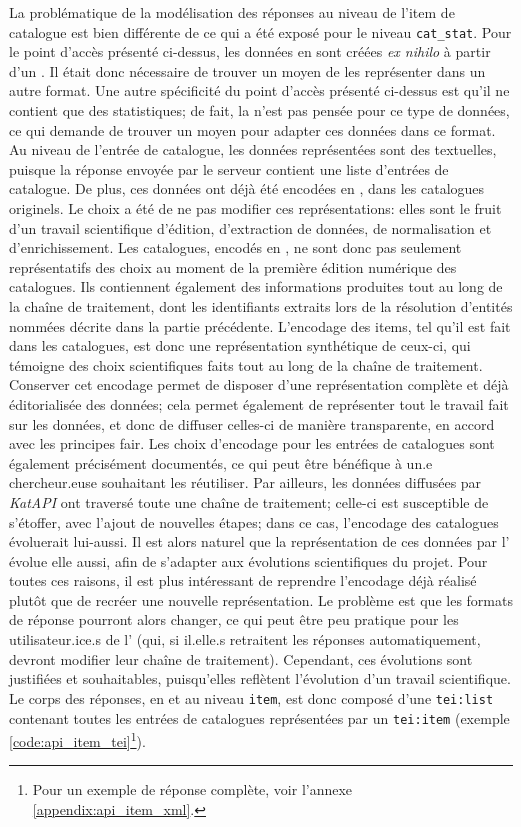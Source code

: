 La problématique de la modélisation des réponses au niveau de l'item de catalogue est bien différente de ce qui a été exposé pour le niveau \texttt{cat\_stat}. Pour le point d'accès présenté ci-dessus, les données en \tei{} sont créées \textit{ex nihilo} à partir d'un \json{}. Il était donc nécessaire de trouver un moyen de les représenter dans un autre format. Une autre spécificité du point d'accès présenté ci-dessus est qu'il ne contient que des statistiques; de fait, la \tei{} n'est pas pensée pour ce type de données, ce qui demande de trouver un moyen pour adapter ces données dans ce format. Au niveau de l'entrée de catalogue, les données représentées sont des textuelles, puisque la réponse envoyée par le serveur contient une liste d'entrées de catalogue. De plus, ces données ont déjà été encodées en \tei{}, dans les catalogues originels. Le choix a été de ne pas modifier ces représentations: elles sont le fruit d'un travail scientifique d'édition, d'extraction de données, de normalisation et d'enrichissement. Les catalogues, encodés en \tei{}, ne sont donc pas seulement représentatifs des choix au moment de la première édition numérique des catalogues. Ils contiennent également des informations produites tout au long de la chaîne de traitement, dont les identifiants \wkd{} extraits lors de la résolution d'entités nommées décrite dans la partie précédente. L'encodage des items, tel qu'il est fait dans les catalogues, est donc une représentation synthétique de ceux-ci, qui témoigne des choix scientifiques faits tout au long de la chaîne de traitement. Conserver cet encodage permet de disposer d'une représentation complète et déjà éditorialisée des données; cela permet également de représenter tout le travail fait sur les données, et donc de diffuser celles-ci de manière transparente, en accord avec les principes \gls{fair}. Les choix d'encodage pour les entrées de catalogues sont également précisément documentés, ce qui peut être bénéfique à un.e chercheur.euse souhaitant les réutiliser. Par ailleurs, les données diffusées par \textit{KatAPI} ont traversé toute une chaîne de traitement; celle-ci est susceptible de s'étoffer, avec l'ajout de nouvelles étapes; dans ce cas, l'encodage des catalogues évoluerait lui-aussi. Il est alors naturel que la représentation de ces données par l'\api{} évolue elle aussi, afin de s'adapter aux évolutions scientifiques du projet. Pour toutes ces raisons, il est plus intéressant de reprendre l'encodage déjà réalisé plutôt que de recréer une nouvelle représentation. Le problème est que les formats de réponse pourront alors changer, ce qui peut être peu pratique pour les utilisateur.ice.s de l'\api{} (qui, si il.elle.s retraitent les réponses automatiquement, devront modifier leur chaîne de traitement). Cependant, ces évolutions sont justifiées et souhaitables, puisqu'elles reflètent l'évolution d'un travail scientifique. Le corps des réponses, en \tei{} et au niveau \texttt{item}, est donc composé d'une \texttt{tei:list} contenant toutes les entrées de catalogues représentées par un \texttt{tei:item} (exemple \ref{code:api_item_tei}\footnote{
	Pour un exemple de réponse complète, voir l'annexe \ref{appendix:api_item_xml}.
}).

